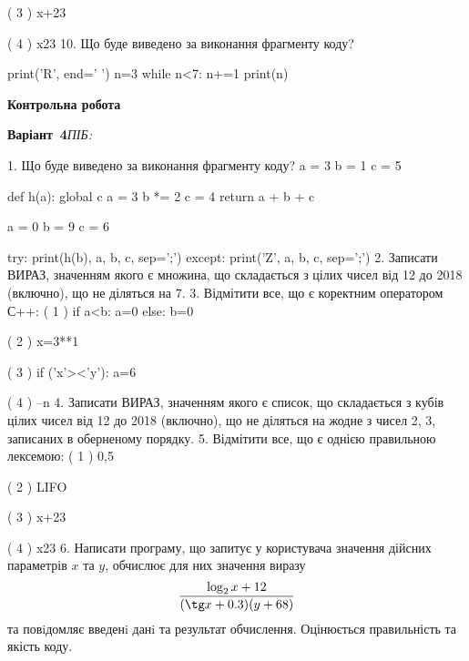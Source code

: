 \documentclass[11pt]{article}
\begin{document}
( 3 ) x+23

( 4 ) x23
\vspace{5mm}
10. Що буде виведено за виконання фрагменту коду?

print('R', end=' ')
n=3
while n<7:
    n+=1
print(n)

\vspace{5mm}










\newpage

\newpage

{\large\textbf{Контрольна робота}}

\textbf{Варіант \No\,4}\hfill \textit{ПІБ:}\,\underline{\hspace{60mm}}
\vspace{4mm}

1. Що буде виведено за виконання фрагменту коду?
a = 3
b = 1
c = 5

def h(a):
global c    a = 3
    b *= 2
    c = 4
    return a + b + c

a = 0
b = 9
c = 6

try:
    print(h(b), a, b, c, sep=';')
except:
    print('Z', a, b, c, sep=';')
\vspace{5mm}
2. 
Записати ВИРАЗ, значенням якого є множина, що складається з цілих чисел від 12 до 2018 (включно), що не діляться на 7.\vspace{5mm}
3. %
Відмітити все, що є коректним оператором С++:
( 1 ) if a<b: a=0 else: b=0

( 2 ) x=3**1

( 3 ) if ('x'><'y'): a=6

( 4 ) --n
\vspace{5mm}
4. 
Записати ВИРАЗ, значенням якого є список, що складається з кубів цілих чисел від 12 до 2018 (включно), що не діляться на жодне з чисел 2, 3, записаних в оберненому порядку.\vspace{5mm}
5. %
Відмітити все, що є однією правильною лексемою:
( 1 ) 0,5

( 2 ) LIFO

( 3 ) x+23

( 4 ) x23
\vspace{5mm}
6. 
Написати програму, що запитує у користувача значення дійсних параметрів $x$ та $y$, обчислює для них значення виразу 
$$\frac{\log_{2} x + 12}{(\tg x + 0.3) (y + 68)}$$ 
та повiдомляє введенi данi та результат обчислення.
 Оцінюється правильність та якість коду.
\end{document}
